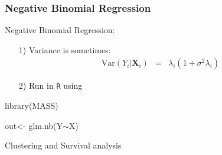 \documentclass{beamer}
\begin{document}
\begin{frame}
\frametitle{Negative Binomial Regression}

Negative Binomial Regression:
\begin{itemize}
\item[1)] Variance is sometimes:
\begin{eqnarray}
\text{Var}(Y_{i}| \boldsymbol{X}_{i}) & = & \lambda_{i}(1 + \sigma^2 \lambda_{i})\nonumber
\end{eqnarray}
\item[2)] Run in {\tt R} using
\end{itemize}

\begin{semiverbatim}
library(MASS)

out<- glm.nb(Y$\sim$X)

\end{semiverbatim}

\end{frame}


\begin{frame}

\huge
Clustering and Survival analysis

\end{frame}
\end{document}
